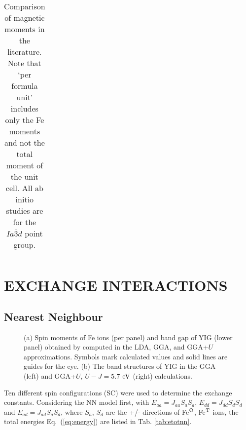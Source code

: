 \documentclass[aps,pre,reprint,superscriptaddress,longbibliography]{revtex4-1}
\begin{document}
{\begin{table}
\begin{ruledtabular}
\begin{tabular}{c c c l l}
\end{tabular}
\caption{Comparison of magnetic moments in the literature. Note that ‘per formula unit’ includes only the Fe moments and not the total moment of the unit cell. All ab initio studies are for the $Ia\bar{3}d$ point group.\label{tab:magmom}}
\end{ruledtabular}
\end{table}

\section{EXCHANGE INTERACTIONS}

\subsection{Nearest Neighbour}

\begin{figure}
        \centering
        \caption{(a) Spin moments of Fe ions (per panel) and band gap of YIG (lower panel) obtained by computed in the LDA, GGA, and GGA+$U$ approximations. Symbols mark calculated values and solid lines are guides for the eye. (b) The band structures of YIG in the GGA (left) and GGA+$U$, $U - J=5.7$ ${\rm eV}$ (right) calculations. \label{band}}
\end{figure}





Ten different spin configurations (SC) were used to determine the exchange constants. Considering the NN model first, with $E_{aa}=J_{aa}S_aS_a$, $E_{dd}=J_{dd}S_dS_d$ and $E_{ad}=J_{ad}S_aS_d$, where $S_a$, $S_d$ are the +/- directions of Fe$^{\rm O}$, Fe$^{\rm T}$ ions, the total energies Eq.~(\ref{eq:energy}) are listed in Tab. \ref{tab:etotnn}. 

}
\end{document}
